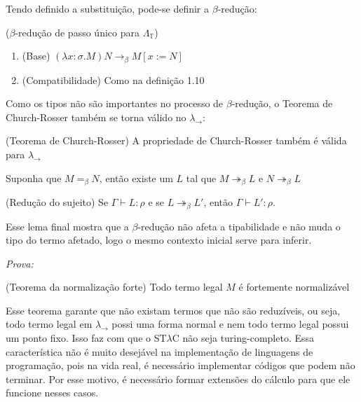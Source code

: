 \documentclass[../main.tex]{subfiles}
\begin{document}
Tendo definido a substituição, pode-se definir a $\beta$-redução:

\begin{definition}($\beta$-redução de passo único para $\Lambda_{\mathbb{T}}$)
    \hfill
    \begin{enumerate}
        \item (Base) $(\lambda x : \sigma . M)N \rightarrow_{\beta} M[x := N]$
        \item (Compatibilidade) Como na definição 1.10
    \end{enumerate}
\end{definition}

Como os tipos não são importantes no processo de $\beta$-redução, o Teorema de Church-Rosser também se torna válido no $\lambda_{\rightarrow}$:

\begin{theorem}(Teorema de Church-Rosser)
    A propriedade de Church-Rosser também é válida para $\lambda_{\rightarrow}$
\end{theorem}

\begin{corollary}
    Suponha que $M =_{\beta} N$, então existe um $L$ tal que $M \twoheadrightarrow_{\beta} L$ e $N \twoheadrightarrow_{\beta} L$
\end{corollary}

\begin{lemma}(Redução do sujeito)
    Se $\Gamma \vdash L : \rho$ e se $L \twoheadrightarrow_{\beta} L'$, então $\Gamma \vdash L' : \rho$.
\end{lemma}

Esse lema final mostra que a $\beta$-redução não afeta a tipabilidade e não muda o tipo do termo afetado, logo o mesmo contexto inicial serve para inferir.

\emph{Prova: }

\begin{theorem}(Teorema da normalização forte)
    Todo termo legal $M$ é fortemente normalizável
\end{theorem}

Esse teorema garante que não existam termos que não são reduzíveis, ou seja, todo termo legal em $\lambda_{\rightarrow}$ possi uma forma normal e nem todo termo legal possui um ponto fixo. Isso faz com que o ST$\lambda$C não seja turing-completo.
Essa característica não é muito desejável na implementação de linguagens de programação, pois na vida real, é necessário implementar códigos que podem não terminar. Por esse motivo, é necessário formar extensões do cálculo para que ele funcione nesses casos. 
\end{document}
